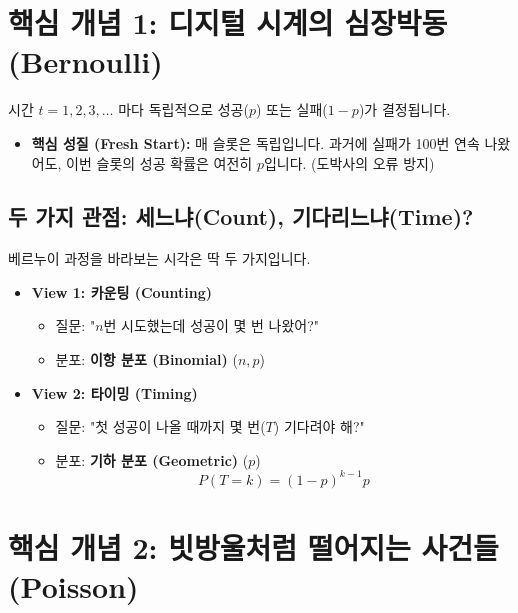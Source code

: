\documentclass[11pt,a4paper]{book}
\theoremstyle{definition}
\begin{document}
\section{핵심 개념 1: 디지털 시계의 심장박동 (Bernoulli)}


\begin{conceptbox}[title={정의: 매 순간의 동전 던지기}]
시간 $t=1, 2, 3, \dots$ 마다 독립적으로 성공($p$) 또는 실패($1-p$)가 결정됩니다.
\begin{itemize}
    \item \textbf{핵심 성질 (Fresh Start):} 매 슬롯은 독립입니다. 과거에 실패가 100번 연속 나왔어도, 이번 슬롯의 성공 확률은 여전히 $p$입니다. (도박사의 오류 방지)
\end{itemize}
\end{conceptbox}

\subsection{두 가지 관점: 세느냐(Count), 기다리느냐(Time)?}
베르누이 과정을 바라보는 시각은 딱 두 가지입니다.

\begin{itemize}
    \item \textbf{View 1: 카운팅 (Counting)}
    \begin{itemize}
        \item 질문: "$n$번 시도했는데 성공이 몇 번 나왔어?"
        \item 분포: \textbf{이항 분포 (Binomial)} ($n, p$)
    \end{itemize}
    
    \item \textbf{View 2: 타이밍 (Timing)}
    \begin{itemize}
        \item 질문: "첫 성공이 나올 때까지 몇 번($T$) 기다려야 해?"
        \item 분포: \textbf{기하 분포 (Geometric)} ($p$)
        \[ P(T=k) = (1-p)^{k-1}p \]
    \end{itemize}
\end{itemize}

\section{핵심 개념 2: 빗방울처럼 떨어지는 사건들 (Poisson)}
\end{document}

